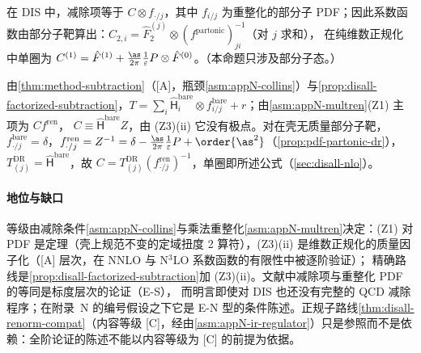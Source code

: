 \begin{proposition}\label{prop:disall-h5}
在 DIS 中，减除项等于 $C\otimes f_{\cdot/j}$，其中 $f_{i/j}$ 为重整化的部分子 PDF；因此系数函数由部分子靶算出：$C_{2,i}=\hat F_2^{(j)}\otimes(f^{\mathrm{partonic}})^{-1}_{ji}$（对 $j$ 求和），
在纯维数正规化中单圈为 $C^{(1)}=\hat F^{(1)}+\frac{\as}{2\pi}\frac1\varepsilon P\otimes\hat F^{(0)}$。（本命题只涉及部分子态。）
\end{proposition}

\begin{proofsketch}
由\cref{thm:method-subtraction}（[A]，瓶颈\cref{asm:appN-collins}）与\cref{prop:disall-factorized-subtraction}，$T=\sum_i\hat{\mathsf H}^{\mathrm{bare}}_i\otimes f^{\mathrm{bare}}_{i/j}+r$；由\cref{asm:appN-multren}(Z1) 主项为 $Cf^{\mathrm{ren}}$，
$C\equiv\hat{\mathsf H}^{\mathrm{bare}}Z$，由 (Z3)(ii) 它没有极点。对在壳无质量部分子靶，$f^{\mathrm{bare}}_{\cdot/j}=\delta$，$f^{\mathrm{ren}}_{\cdot/j}=Z^{-1}=\delta-\frac{\as}{2\pi}\frac1\varepsilon P+\order{\as^2}$（\cref{prop:pdf-partonic-dr}），
$T^{\mathrm{DR}}_{(j)}=\hat{\mathsf H}^{\mathrm{bare}}$，故 $C=T^{\mathrm{DR}}_{(j)}(f^{\mathrm{ren}}_{\cdot/j})^{-1}$，单圈即所述公式（\cref{sec:disall-nlo}）。
\end{proofsketch}

\paragraph{地位与缺口}
等级由减除条件\cref{asm:appN-collins}与乘法重整化\cref{asm:appN-multren}决定：(Z1) 对 PDF 是定理（壳上规范不变的定域扭度 2 算符），(Z3)(ii) 是维数正规化的质量因子化（[A] 层次，在 NNLO 与 N$^3$LO 系数函数的有限性中被逐阶验证）；
精确路线是\cref{prop:disall-factorized-subtraction}加 (Z3)(ii)。文献中减除项与重整化 PDF 的等同是标度层次的论证（E-S）\cite[第~10~章]{Collins2011}，
而\cite[第~10.1~节]{CollinsSoperSterman1989}明言即使对 DIS 也还没有完整的 QCD 减除程序；在附录~N 的编号假设之下它是 E-N 型的条件陈述。正规子路线\cref{thm:disall-renorm-compat}（内容等级 [C]，经由\cref{asm:appN-ir-regulator}）只是参照而不是依赖：全阶论证的陈述不能以内容等级为 [C] 的前提为依据。

